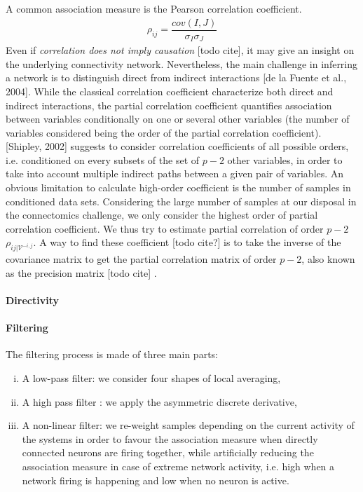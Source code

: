 \documentclass[wcp]{jmlr}
\begin{document}
A common association measure is the Pearson correlation coefficient. 
\begin{align}
\rho_{ij} = \dfrac{cov(I,J)}{\sigma_I \sigma_J}
\end{align}
Even if \textit{correlation does not imply causation} [todo cite], it may give an insight on the underlying connectivity network. Nevertheless, the main challenge in inferring a network is to distinguish direct from indirect interactions [de la Fuente et al., 2004]. While the classical correlation coefficient characterize both direct and indirect interactions, the partial correlation coefficient quantifies association between variables conditionally on one or several other variables (the number of variables considered being the order of the partial correlation coefficient). [Shipley, 2002] suggests to consider correlation coefficients of all possible orders, i.e. conditioned on every subsets of the set of $p-2$ other variables, in order to take into account multiple indirect paths between a given pair of variables.  An obvious limitation to calculate high-order coefficient is the number of samples in conditioned data sets. Considering the large number of samples at our disposal in the connectomics challenge, we only consider the highest order of partial correlation coefficient. We thus try to estimate partial correlation of order $p-2$ $\rho_{ij | \mathcal{V}^{-i,j}}$. A way to find these coefficient [todo cite?] is to take the inverse of the covariance matrix to get the partial correlation matrix of order $p-2$, also known as the precision matrix [todo cite] .

\paragraph{Directivity}

\paragraph{Filtering\\}

The filtering process is made of three main parts:

\begin{enumerate}[i.]
\item A low-pass filter: we consider four shapes of local averaging, 
\item A high pass filter : we apply the asymmetric discrete derivative,
\item A non-linear filter: we re-weight samples depending on the current activity of the systems in order to favour the association measure when directly connected neurons are firing together, while artificially reducing the association measure in case of extreme network activity, i.e. high when a network firing is happening and low when no neuron is active.
\end{enumerate}
\end{document}
